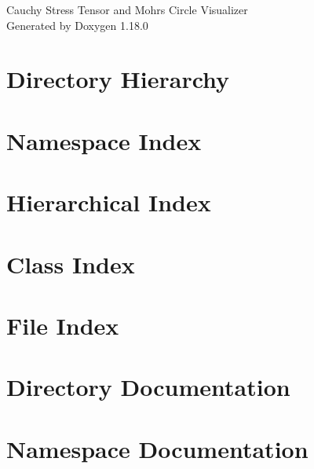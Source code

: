 \documentclass[twoside]{book}
\newcommand{\+}{\discretionary{\mbox{\scriptsize$\hookleftarrow$}}{}{}}
\newcommand{\clearemptydoublepage}{%
    \newpage{\pagestyle{empty}\cleardoublepage}%
  }
\begin{document}
  \raggedbottom
    \hypersetup{pageanchor=false,
                bookmarksnumbered=true,
                pdfencoding=unicode
               }
  \begin{titlepage}
  \vspace*{7cm}
  \begin{center}%
  {\Large Cauchy Stress Tensor and Mohr\textquotesingle{}s Circle Visualizer}\\
  \vspace*{1cm}
  {\large Generated by Doxygen 1.18.0}\\
  \end{center}
  \end{titlepage}
  \clearemptydoublepage
  \tableofcontents
  \clearemptydoublepage
  \hypersetup{pageanchor=true}

\chapter{Directory Hierarchy}

\chapter{Namespace Index}

\chapter{Hierarchical Index}

\chapter{Class Index}

\chapter{File Index}

\chapter{Directory Documentation}





\chapter{Namespace Documentation}




\end{document}

